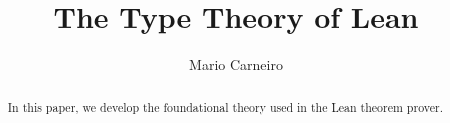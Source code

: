 \documentclass{llncs}
\begin{document}
\title{The Type Theory of Lean}
%
%
\author{Mario Carneiro}
%
%
%

\maketitle              %

\begin{abstract}
In this paper, we develop the foundational theory used in the Lean theorem prover.
\end{abstract}
%
%

%

%
%
%
\end{document}
